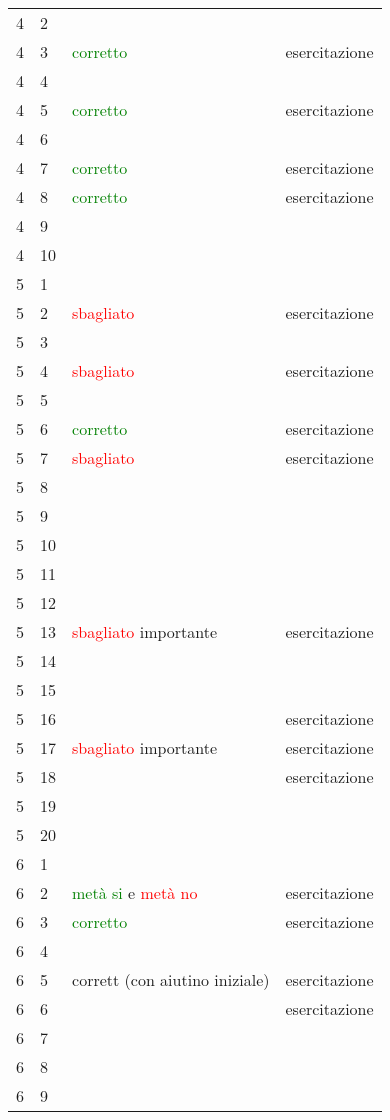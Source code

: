 \documentclass[a4paper, 9pt]{article}
\begin{document}
\begin{tabular}{llll}
        4 & 2 & & \\
        4 & 3 & \textcolor{green}{corretto} & esercitazione\\
        4 & 4 & & \\
        4 & 5 & \textcolor{green}{corretto} & esercitazione\\
        4 & 6 & & \\
        4 & 7 & \textcolor{green}{corretto} & esercitazione\\
        4 & 8 & \textcolor{green}{corretto} & esercitazione\\
        4 & 9 & & \\
        4 & 10 & & \\
        \hline
        5 & 1 & & \\
        5 & 2 & \textcolor{red}{sbagliato} & esercitazione\\
        5 & 3 & & \\
        5 & 4 & \textcolor{red}{sbagliato} & esercitazione\\
        5 & 5 & & \\
        5 & 6 & \textcolor{green}{corretto} & esercitazione\\
        5 & 7 & \textcolor{red}{sbagliato} & esercitazione\\
        5 & 8 & & \\
        5 & 9 & & \\
        5 & 10 & & \\
        5 & 11 & & \\
        5 & 12 & & \\
        5 & 13 & \textcolor{red}{sbagliato} importante & esercitazione\\
        5 & 14 & & \\
        5 & 15 & & \\
        5 & 16 & & esercitazione\\
        5 & 17 & \textcolor{red}{sbagliato} importante & esercitazione\\
        5 & 18 & & esercitazione\\
        5 & 19 & & \\
        5 & 20 & & \\
        \hline
        6 & 1 & & \\
        6 & 2 & \textcolor{green}{metà si} e \textcolor{red}{metà no}& esercitazione\\
        6 & 3 & \textcolor{green}{corretto} & esercitazione\\
        6 & 4 & & \\
        6 & 5 & \textcolor{gree}{corrett} (con aiutino iniziale) & esercitazione\\
        6 & 6 & & esercitazione\\
        6 & 7 & & \\
        6 & 8 & & \\
        6 & 9 & & \\
    \end{tabular}
\end{document}
